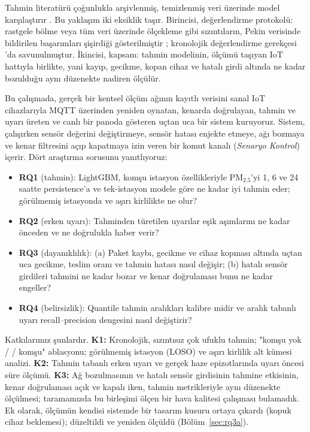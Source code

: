 \documentclass[conference]{IEEEtran}
\newcommand{\pmtwo}{PM$_{2.5}$}
\begin{document}
Tahmin literatürü çoğunlukla arşivlenmiş, temizlenmiş veri üzerinde model karşılaştırır \cite{R3,R9,R10,R11,R12}. Bu yaklaşım iki eksiklik taşır. Birincisi, değerlendirme protokolü: rastgele bölme veya tüm veri üzerinde ölçekleme gibi sızıntıların, Pekin verisinde bildirilen başarımları şişirdiği gösterilmiştir \cite{R13,R17}; kronolojik değerlendirme gerekçesi \cite{R16}'da savunulmuştur. İkincisi, kapsam: tahmin modelinin, ölçümü taşıyan IoT hattıyla birlikte, yani kayıp, gecikme, kopan cihaz ve hatalı girdi altında ne kadar bozulduğu aynı düzenekte nadiren ölçülür.

Bu çalışmada, gerçek bir kentsel ölçüm ağının kayıtlı verisini sanal IoT cihazlarıyla MQTT üzerinden yeniden oynatan, kenarda doğrulayan, tahmin ve uyarı üreten ve canlı bir panoda gösteren uçtan uca bir sistem kuruyoruz. Sistem, çalışırken sensör değerini değiştirmeye, sensör hatası enjekte etmeye, ağı bozmaya ve kenar filtresini açıp kapatmaya izin veren bir komut kanalı (\emph{Senaryo Kontrol}) içerir. Dört araştırma sorusunu yanıtlıyoruz:
\begin{itemize}
\item \textbf{RQ1} (tahmin): LightGBM, komşu istasyon özellikleriyle \pmtwo{}'yi 1, 6 ve 24 saatte persistence'a ve tek-istasyon modele göre ne kadar iyi tahmin eder; görülmemiş istasyonda ve aşırı kirlilikte ne olur?
\item \textbf{RQ2} (erken uyarı): Tahminden türetilen uyarılar eşik aşımlarını ne kadar önceden ve ne doğrulukla haber verir?
\item \textbf{RQ3} (dayanıklılık): (a) Paket kaybı, gecikme ve cihaz kopması altında uçtan uca gecikme, teslim oranı ve tahmin hatası nasıl değişir; (b) hatalı sensör girdileri tahmini ne kadar bozar ve kenar doğrulaması bunu ne kadar engeller?
\item \textbf{RQ4} (belirsizlik): Quantile tahmin aralıkları kalibre midir ve aralık tabanlı uyarı recall--precision dengesini nasıl değiştirir?
\end{itemize}

Katkılarımız şunlardır. \textbf{K1:} Kronolojik, sızıntısız çok ufuklu tahmin; "komşu yok / \nKThree{} / \nKEleven{} komşu" ablasyonu; görülmemiş istasyon (LOSO) ve aşırı kirlilik alt kümesi analizi. \textbf{K2:} Tahmin tabanlı erken uyarı ve gerçek haze epizotlarında uyarı öncesi süre ölçümü. \textbf{K3:} Ağ bozulmasının ve hatalı sensör girdisinin tahmine etkisinin, kenar doğrulaması açık ve kapalı iken, tahmin metrikleriyle aynı düzenekte ölçülmesi; taramamızda bu birleşimi ölçen bir hava kalitesi çalışması bulamadık. Ek olarak, ölçümün kendisi sistemde bir tasarım kusuru ortaya çıkardı (kopuk cihaz beklemesi); düzeltildi ve yeniden ölçüldü (Bölüm~\ref{sec:rq3a}).
\end{document}
